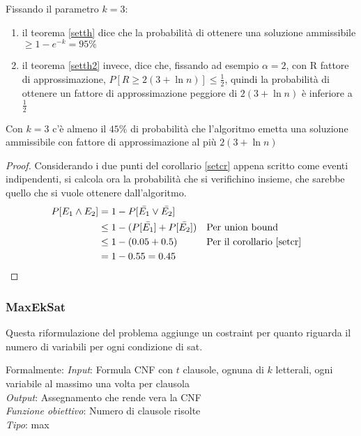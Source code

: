 \begin{corollary}
    \label{setcr}
    Fissando il parametro $k = 3$:
    \begin{enumerate}
        \item il teorema \ref{setth} dice che la probabilità di ottenere una soluzione ammissibile
        $\geq 1-e^{-k} = 95\%$
        \item il teorema \ref{setth2} invece, dice che, fissando ad esempio $\alpha=2$, con R fattore di 
        approssimazione,  $P[R \geq 2(3 + \ln n)] \leq \frac{1}{2}$, quindi la probabilità di ottenere un fattore
        di approssimazione peggiore di $2(3 + \ln n)$ è inferiore a $\frac{1}{2}$
    \end{enumerate}
\end{corollary}

\begin{corollary}
    Con $k = 3$ c'è almeno il $45\%$ di probabilità che l'algoritmo emetta una 
    soluzione ammissibile con fattore di approssimazione al più $2(3+\ln n)$
\end{corollary}
\begin{proof}
    Considerando i due punti del corollario \ref{setcr} appena scritto come eventi indipendenti, 
    si calcola ora la probabilità che si verifichino insieme, che sarebbe quello che si vuole 
    ottenere dall'algoritmo.
    \begin{equation}
        \begin{aligned}
            P[E_1 \wedge E_2] &= 1 - P[\bar{E_1} \lor \bar{E_2}]\\
            &\leq 1 - (P[\bar{E_1}] + P[\bar{E_2}]) && \text{Per union bound}\\
            &\leq 1 - (0.05 + 0.5) && \text{Per il corollario \ref{setcr}}\\
            &= 1 - 0.55 = 0.45
        \end{aligned}
    \end{equation}    
\end{proof}

\subsubsection{MaxEkSat}
\label{eksat}
Questa riformulazione del problema aggiunge un costraint per quanto riguarda il numero di 
variabili per ogni condizione di sat.

Formalmente:
\emph{Input}: Formula CNF con $t$ clausole, ognuna di $k$ letterali, ogni variabile al massimo una volta
per clausola\\
\emph{Output}: Assegnamento che rende vera la CNF\\
\emph{Funzione obiettivo}: Numero di clausole risolte\\
\emph{Tipo}: max


